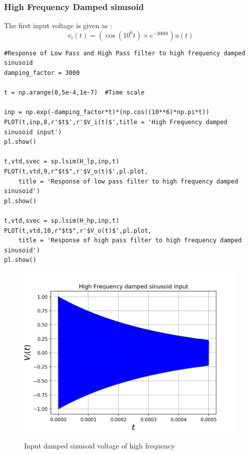 \documentclass[11pt, a4paper]{article}
\begin{document}
\subsubsection{High Frequency Damped sinusoid}
{
The first input voltage is given as :
\[v_i(t) = (\cos(10^6 t) \times e^{-3000t})u(t)\]
}
\begin{verbatim}
#Response of Low Pass and High Pass filter to high frequency damped sinusoid
damping_factor = 3000

t = np.arange(0,5e-4,1e-7)  #Time scale

inp = np.exp(-damping_factor*t)*(np.cos((10**6)*np.pi*t))
PLOT(t,inp,8,r'$t$',r'$V_i(t)$',title = 'High Frequency damped sinusoid input')
pl.show()

t,vtd,svec = sp.lsim(H_lp,inp,t)
PLOT(t,vtd,9,r"$t$",r'$V_o(t)$',pl.plot,
	title = 'Response of low pass filter to high frequency damped sinusoid')
pl.show()

t,vtd,svec = sp.lsim(H_hp,inp,t)
PLOT(t,vtd,10,r"$t$",r'$V_o(t)$',pl.plot,
	title = 'Response of high pass filter to high frequency damped sinusoid')
pl.show()

\end{verbatim}
\begin{figure}[H]
   	\centering
   	\includegraphics[scale=0.5]{vi_high.png}
   	\label{fig:vi_high}
   	\caption{Input damped sinusoid voltage of high frequency}
\end{figure}
\end{document}
